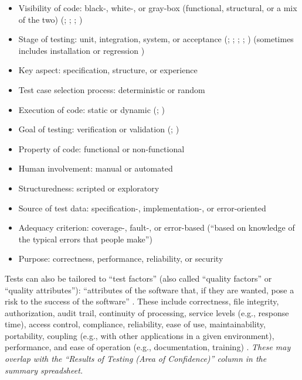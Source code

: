 \begin{itemize}
      \item Visibility of code: black-, white-, or gray-box (functional,
            structural, or a mix of the two)
            (\citealp[pp.~5-10, 5-16]{SWEBOK2024}; \citealp[p.~213]{KuļešovsEtAl2013};
            \citealp[pp.~53, 218]{Patton2006}; \citealp[p.~69]{Perry2006})
      \item Stage of testing: unit, integration, system, or acceptance
            (\citealp[pp.~5-6 to 5-7]{SWEBOK2024}; \citealp[p.~218]{KuļešovsEtAl2013};
            \citealp{Patton2006}; \citealp{Perry2006}; \citealp{PetersAndPedrycz2000})
            (sometimes includes installation \citep[p.~439]{vanVliet2000} or
            regression \citep[p.~3]{BarbosaEtAl2006})
      \item Key aspect: specification, structure, or experience
            \citep[p.~5-10]{SWEBOK2024}
      \item Test case selection process: deterministic or random
            \citep[p.~5-16]{SWEBOK2024}
      \item Execution of code: static or dynamic
            (\citealp[p.~214]{KuļešovsEtAl2013}; \citealp[p.~53]{Patton2006})
      \item Goal of testing: verification or validation
            (\citealp[p.~214]{KuļešovsEtAl2013}; \citealp[pp.~69-70]{Perry2006})
      \item Property of code: functional or non-functional
            \citep[p.~213]{KuļešovsEtAl2013}
      \item Human involvement: manual or automated
            \citep[p.~214]{KuļešovsEtAl2013}
      \item Structuredness: scripted or exploratory
            \citep[p.~214]{KuļešovsEtAl2013}
      \item Source of test data: specification-, implementation-, or
            error-oriented \citep[p.~440]{PetersAndPedrycz2000}
      \item Adequacy criterion: coverage-, fault-, or error-based
            (``based on knowledge of the typical errors that people make'')
            \citep[pp.~398-399]{vanVliet2000}
      \item Purpose: correctness, performance, reliability, or security
            \citep{Pan1999}
\end{itemize}

Tests can also be tailored to ``test factors'' (also called ``quality factors''
or ``quality attributes''): ``attributes of the software that, if they are
wanted, pose a risk to the success of the software''
\citep[p.~40]{Perry2006}. These include correctness, file integrity,
authorization, audit trail, continuity of processing, service levels
(e.g., response time), access control, compliance, reliability, ease of use,
maintainability, portability, coupling (e.g., with other applications in a
given environment), performance, and ease of operation (e.g., documentation,
training) \citep[pp.~40-41]{Perry2006}. \emph{These may overlap with
      the ``Results of Testing (Area of Confidence)'' column in the summary
      spreadsheet.}

